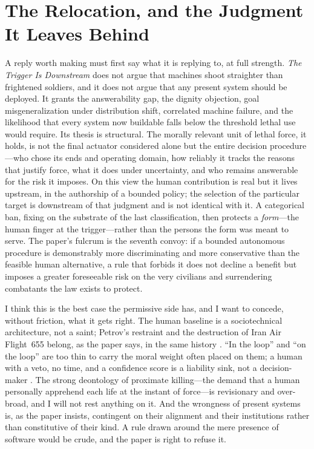 \documentclass[11pt]{article}
\begin{document}
\begin{abstract}
artifact could ever occupy the office it would exercise, at which point it would no longer be a weapon, and the question would have changed.
\end{abstract}

\section{The Relocation, and the Judgment It Leaves Behind}
\label{sec:relocation}

A reply worth making must first say what it is replying to, at full strength. \textit{The Trigger Is Downstream} \citep{nyx_trigger2026} does not argue that machines shoot straighter than frightened soldiers, and it does not argue that any present system should be deployed. It grants the answerability gap, the dignity objection, goal misgeneralization under distribution shift, correlated machine failure, and the likelihood that every system now buildable falls below the threshold lethal use would require. Its thesis is structural. The morally relevant unit of lethal force, it holds, is not the final actuator considered alone but the entire decision procedure---who chose its ends and operating domain, how reliably it tracks the reasons that justify force, what it does under uncertainty, and who remains answerable for the risk it imposes. On this view the human contribution is real but it lives upstream, in the authorship of a bounded policy; the selection of the particular target is downstream of that judgment and is not identical with it. A categorical ban, fixing on the substrate of the last classification, then protects a \emph{form}---the human finger at the trigger---rather than the persons the form was meant to serve. The paper's fulcrum is the seventh convoy: if a bounded autonomous procedure is demonstrably more discriminating and more conservative than the feasible human alternative, a rule that forbids it does not decline a benefit but imposes a greater foreseeable risk on the very civilians and surrendering combatants the law exists to protect.

I think this is the best case the permissive side has, and I want to concede, without friction, what it gets right. The human baseline is a sociotechnical architecture, not a saint; Petrov's restraint and the destruction of Iran Air Flight~655 belong, as the paper says, in the same history \citep{hoffman2009, fogarty1988, scharre2018}. ``In the loop'' and ``on the loop'' are too thin to carry the moral weight often placed on them; a human with a veto, no time, and a confidence score is a liability sink, not a decision-maker \citep{parasuraman1997, elish2019}. The strong deontology of proximate killing---the demand that a human personally apprehend each life at the instant of force---is revisionary and over-broad, and I will not rest anything on it. And the wrongness of present systems is, as the paper insists, contingent on their alignment and their institutions rather than constitutive of their kind. A rule drawn around the mere presence of software would be crude, and the paper is right to refuse it.
\end{document}
